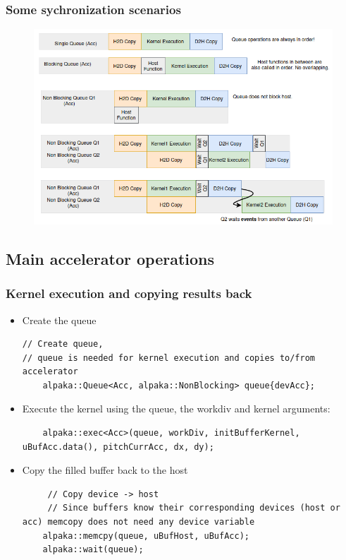 \documentclass[9pt]{beamer}
\begin{document}
\begin{frame}
\frametitle{Some sychronization scenarios}
\begin{figure}
    \centering
    \includegraphics[width=0.93\linewidth]{Screenshot from 2024-10-16 16-53-06.png}
    \label{fig:enter-label}
\end{figure}
\end{frame}

\subsection{Main accelerator operations}
\begin{frame}[fragile]
\frametitle{Kernel execution and copying results back}
\begin{itemize}

\item Create the queue
\lstset{basicstyle=\ttfamily\scriptsize}
\begin{lstlisting}
// Create queue,
// queue is needed for kernel execution and copies to/from accelerator
    alpaka::Queue<Acc, alpaka::NonBlocking> queue{devAcc};
\end{lstlisting}

\item Execute the kernel using the queue, the workdiv and kernel arguments:
\lstset{basicstyle=\ttfamily\scriptsize}
\begin{lstlisting}
    alpaka::exec<Acc>(queue, workDiv, initBufferKernel, uBufAcc.data(), pitchCurrAcc, dx, dy);
\end{lstlisting}
\item Copy the filled buffer back to the host
\begin{lstlisting}
     // Copy device -> host
     // Since buffers know their corresponding devices (host or acc) memcopy does not need any device variable
    alpaka::memcpy(queue, uBufHost, uBufAcc);
    alpaka::wait(queue);
\end{lstlisting}
\end{itemize}
\end{frame}
\end{document}
